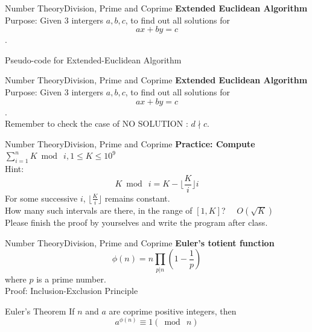 \documentclass[mathserif,10pt]{beamer}
\begin{document}
\begin{frame}{Number Theory}{Division, Prime and Coprime}
\textbf{\large Extended Euclidean Algorithm} \\[0.2cm]
Purpose: Given 3 intergers $a, b, c$, to find out all solutions for $$ax+by=c$$.
\begin{algorithm}[H]
\begin{algorithmic}[1]
	\ELSE
	\ENDIF
\end{algorithmic}
\caption*{Pseudo-code for Extended-Euclidean Algorithm}
\end{algorithm}
\end{frame}

\begin{frame}{Number Theory}{Division, Prime and Coprime}
\textbf{\large Extended Euclidean Algorithm} \\[0.2cm]
Purpose: Given 3 intergers $a, b, c$, to find out all solutions for $$ax+by=c$$.
\\[0.2cm]
Remember to check the case of NO SOLUTION : $d \nmid c$.
\end{frame}


\begin{frame}{Number Theory}{Division, Prime and Coprime}
\textbf{\large Practice: Compute $\sum_{i=1}^n K \bmod ~i,  1\leq K \leq 10^9$ } \\[0.5cm]
\pause
Hint:
$$K \bmod~i = K - \lfloor \frac{K}{i} \rfloor i$$
\pause 
For some successive $i$, $\lfloor \frac{K}{i} \rfloor$ remains constant. \\
\pause
How many such intervals are there, in the range of $[1, K]$? 
\pause ~~$O(\sqrt{K})$ 
~\\
Please finish the proof by yourselves and write the program after class. 
\end{frame}

\begin{frame}{Number Theory}{Division, Prime and Coprime}
\textbf{\large Euler's totient function}
$$
\phi(n) = n\prod_{p|n} (1-\frac{1}{p}) 
$$
where $p$ is a prime number.
\pause
~\\
Proof: Inclusion-Exclusion Principle
\pause
\begin{block}{Euler's Theorem}
If $n$ and $a$ are coprime positive integers, then
$$a^{\phi(n)} \equiv 1 (\bmod ~ n)$$
\end{block}
\end{frame}
\end{document}
